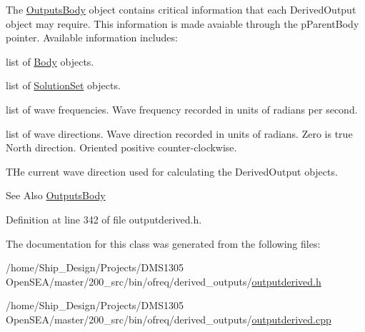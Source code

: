 The \hyperlink{classosea_1_1ofreq_1_1_outputs_body}{Outputs\-Body} object contains critical information that each Derived\-Output object may require. This information is made avaiable through the p\-Parent\-Body pointer. Available information includes\-:
\begin{DoxyItemize}
\item list of \hyperlink{classosea_1_1ofreq_1_1_body}{Body} objects.
\item list of \hyperlink{classosea_1_1ofreq_1_1_solution_set}{Solution\-Set} objects.
\item list of wave frequencies. Wave frequency recorded in units of radians per second.
\item list of wave directions. Wave direction recorded in units of radians. Zero is true North direction. Oriented positive counter-\/clockwise.
\item T\-He current wave direction used for calculating the Derived\-Output objects.
\end{DoxyItemize}

\begin{DoxySeeAlso}{See Also}
\hyperlink{classosea_1_1ofreq_1_1_outputs_body}{Outputs\-Body} 
\end{DoxySeeAlso}


Definition at line 342 of file outputderived.\-h.



The documentation for this class was generated from the following files\-:\begin{DoxyCompactItemize}
\item 
/home/\-Ship\-\_\-\-Design/\-Projects/\-D\-M\-S1305 Open\-S\-E\-A/master/200\-\_\-src/bin/ofreq/derived\-\_\-outputs/\hyperlink{outputderived_8h}{outputderived.\-h}\item 
/home/\-Ship\-\_\-\-Design/\-Projects/\-D\-M\-S1305 Open\-S\-E\-A/master/200\-\_\-src/bin/ofreq/derived\-\_\-outputs/\hyperlink{outputderived_8cpp}{outputderived.\-cpp}\end{DoxyCompactItemize}
